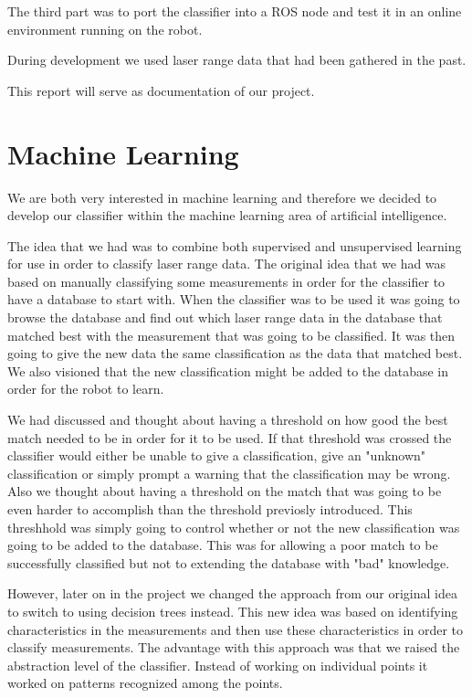 \documentclass[a4paper, 10pt, conference]{ieeeconf}      %
\begin{document}
The third part was to port the classifier into a ROS node and test it in an online environment running on the robot. 

During development we used laser range data that had been gathered in the past.

This report will serve as documentation of our project.

\section{Machine Learning}
We are both very interested in machine learning and therefore we decided to develop our classifier within the machine learning area of artificial intelligence.

The idea that we had was to combine both supervised and unsupervised learning for use in order to classify laser range data. The original idea that we had was based on manually classifying some measurements in order for the classifier to have a database to start with. When the classifier was to be used it was going to browse the database and find out which laser range data in the database that matched best with the measurement that was going to be classified. It was then going to give the new data the same classification as the data that matched best. We also visioned that the new classification might be added to the database in order for the robot to learn.

We had discussed and thought about having a threshold on how good the best match needed to be in order for it to be used. If that threshold was crossed the classifier would either be unable to give a classification, give an "unknown" classification or simply prompt a warning that the classification may be wrong. Also we thought about having a threshold on the match that was going to be even harder to accomplish than the threshold previosly introduced. This threshhold was simply going to control whether or not the new classification was going to be added to the database. This was for allowing a poor match to be successfully classified but not to extending the database with "bad" knowledge.

However, later on in the project we changed the approach from our original idea to switch to using decision trees instead. This new idea was based on identifying characteristics in the measurements and then use these characteristics in order to classify measurements. The advantage with this approach was that we raised the abstraction level of the classifier. Instead of working on individual points it worked on patterns recognized among the points.
\end{document}
